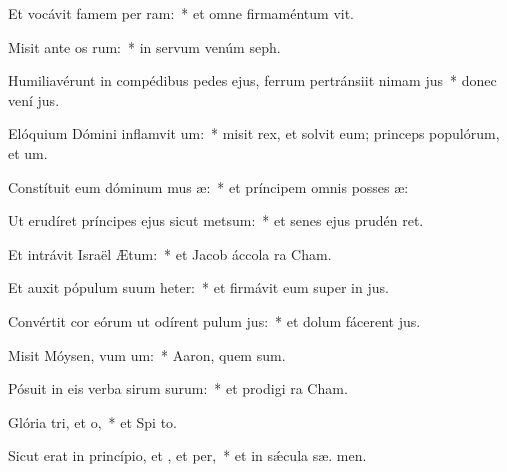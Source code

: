 \item Et vocávit famem per ram:~* et omne firmaméntum  vit.
\item Misit ante os rum:~* in servum venúm  seph.
\item Humiliavérunt in compédibus pedes ejus, ferrum pertránsiit nimam jus~* donec vení  jus.
\item Elóquium Dómini inflamvit um:~* misit rex, et solvit eum; princeps populórum, et  um.
\item Constítuit eum dóminum mus æ:~* et príncipem omnis posses æ:
\item Ut erudíret príncipes ejus sicut metsum:~* et senes ejus prudén ret.
\item Et intrávit Israël  Ætum:~* et Jacob áccola   ra Cham.
\item Et auxit pópulum suum heter:~* et firmávit eum super in jus.
\item Convértit cor eórum ut odírent pulum jus:~* et dolum fácerent   jus.
\item Misit Móysen, vum um:~* Aaron, quem  sum.
\item Pósuit in eis verba sirum surum:~* et prodigi  ra Cham.
\item Glória tri, et o,~* et Spi to.
\item Sicut erat in princípio, et , et per,~* et in sǽcula sæ. men.
